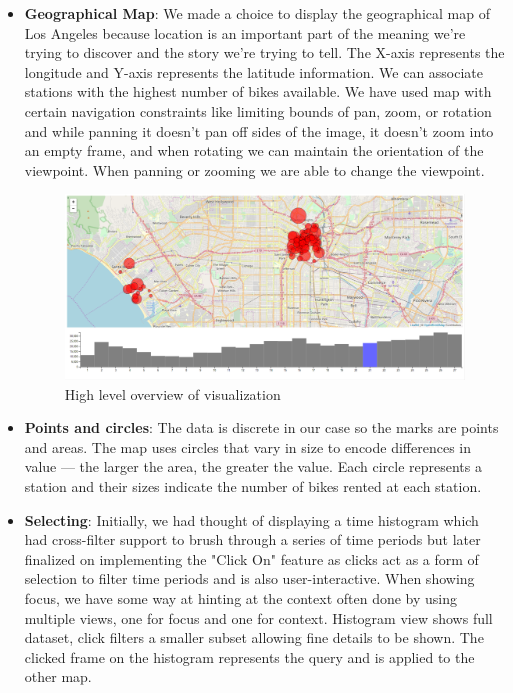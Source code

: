 \begin{itemize}
	\item \textbf{Geographical Map}: We made a choice to display the geographical map of Los Angeles because location is an important part of the meaning we’re trying to discover and the story we’re trying to tell. The X-axis represents the longitude and Y-axis represents the latitude information. We can associate stations with the highest number of bikes available. We have used map with certain navigation constraints like limiting bounds of pan, zoom, or rotation and while panning it doesn't pan off sides of the image, it doesn't zoom into an empty frame, and when rotating we can maintain the orientation of the viewpoint. When panning or zooming we are able to change the viewpoint.
		\begin{figure}[h]
		\centering %
		\includegraphics[scale=0.20]{figs/high_level.png}
		\caption{\footnotesize{High level overview of visualization}}
		\label{fig:First viz Chart}
		\captionsetup{justification=centering,margin=1cm}
		\vspace{-10pt}
	\end{figure}
	\item \textbf{Points and circles}: The data is discrete in our case so the marks are points and areas. The map uses circles that vary in size to encode differences in value — the larger the area, the greater the value. Each circle represents a station and their sizes indicate the number of bikes rented at each station.
	\item \textbf{Selecting}: Initially, we had thought of displaying a time histogram which had cross-filter support to brush through a series of time periods but later finalized on implementing the "Click On" feature as clicks act as a form of selection to filter time periods and is also user-interactive. When showing focus, we have some way at hinting at the context often done by using multiple views, one for focus and one for context. Histogram view shows full dataset, click filters a smaller subset allowing fine details to be shown. The clicked frame on the histogram represents the query and is applied to the other map.  

\end{itemize}
